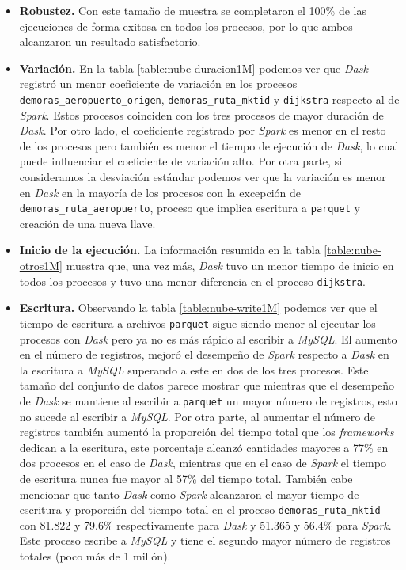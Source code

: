 \begin{itemize}
	\item \textbf{Robustez.} Con este tamaño de muestra se completaron el 100\% de las ejecuciones de forma exitosa en todos los procesos, por lo que ambos alcanzaron un resultado satisfactorio.

	\item \textbf{Variación.} En la tabla \ref{table:nube-duracion1M} podemos ver que \textit{Dask} registró un menor coeficiente de variación en los procesos \texttt{demoras\_aeropuerto\_origen}, \texttt{demoras\_ruta\_mktid} y \texttt{dijkstra} respecto al de \textit{Spark}. Estos procesos coinciden con los tres procesos de mayor duración de \textit{Dask}. Por otro lado, el coeficiente registrado por \textit{Spark} es menor en el resto de los procesos pero también es menor el tiempo de ejecución de \textit{Dask}, lo cual puede influenciar el coeficiente de variación alto. Por otra parte, si consideramos la desviación estándar podemos ver que la variación es menor en \textit{Dask} en la mayoría de los procesos con la excepción de \texttt{demoras\_ruta\_aeropuerto}, proceso que implica escritura a \texttt{parquet} y creación de una nueva llave.
	
	\item \textbf{Inicio de la ejecución.} La información resumida en la tabla \ref{table:nube-otros1M} muestra que, una vez más, \textit{Dask} tuvo un menor tiempo de inicio en todos los procesos y tuvo una menor diferencia en el proceso \texttt{dijkstra}.
	
	\item \textbf{Escritura.} Observando la tabla \ref{table:nube-write1M} podemos ver que el tiempo de escritura a archivos \texttt{parquet} sigue siendo menor al ejecutar los procesos con \textit{Dask} pero ya no es más rápido al escribir a \textit{MySQL}. El aumento en el número de registros, mejoró el desempeño de \textit{Spark} respecto a \textit{Dask} en la escritura a \textit{MySQL} superando a este en dos de los tres procesos. Este tamaño del conjunto de datos parece mostrar que mientras que el desempeño de \textit{Dask} se mantiene al escribir a \texttt{parquet} un mayor número de registros, esto no sucede al escribir a \textit{MySQL}. Por otra parte, al aumentar el número de registros también aumentó la proporción del tiempo total que los \textit{frameworks} dedican a la escritura, este porcentaje alcanzó cantidades mayores a 77\% en dos procesos en el caso de \textit{Dask}, mientras que en el caso de \textit{Spark} el tiempo de escritura nunca fue mayor al 57\% del tiempo total. También cabe mencionar que tanto \textit{Dask} como \textit{Spark} alcanzaron el mayor tiempo de escritura y proporción del tiempo total en el proceso \texttt{demoras\_ruta\_mktid} con 81.822 y 79.6\% respectivamente para \textit{Dask} y 51.365 y 56.4\% para \textit{Spark}. Este proceso escribe a \textit{MySQL} y tiene el segundo mayor número de registros totales (poco más de 1 millón).
	

\end{itemize}
